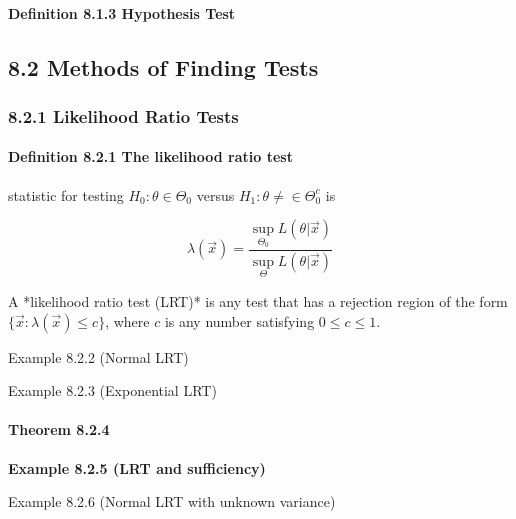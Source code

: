 \documentclass[6pt,twocolumn,Portrait]{article}
\let\oldparagraph\paragraph
\renewcommand{\paragraph}[1]{\oldparagraph{#1}\mbox{}}
\begin{document}
\hypertarget{HypoT}{%
\paragraph{\texorpdfstring{\textbf{Definition 8.1.3 Hypothesis
Test}}{Definition 8.1.3 Hypothesis Test}}\label{HypoT}}

\hypertarget{methods-of-finding-tests}{%
\subsection{8.2 Methods of Finding
Tests}\label{methods-of-finding-tests}}

\hypertarget{likelihood-ratio-tests}{%
\subsubsection{8.2.1 Likelihood Ratio
Tests}\label{likelihood-ratio-tests}}

\hypertarget{LRT}{%
\paragraph{\texorpdfstring{\textbf{Definition 8.2.1 The likelihood ratio
test}}{Definition 8.2.1 The likelihood ratio test}}\label{LRT}}

\begin{multicols}{2}

statistic for testing $H_0:\theta\in\Theta_0$ versus $H_1:\theta\ne\in\Theta_0^c$ is

$$\lambda(\vec x)=\frac{\sup\limits_{\Theta_0} L(\theta|\vec x)}{\sup\limits_{\Theta} L(\theta|\vec x)}$$

A *likelihood ratio test (LRT)* is any test that has a rejection region of the form $\{\vec x:\lambda(\vec x)\le c\}$, where $c$ is any number satisfying $0\le c\le 1$.

\end{multicols}

Example 8.2.2 (Normal LRT)

Example 8.2.3 (Exponential LRT)

\hypertarget{suff-LRT}{%
\paragraph{Theorem 8.2.4}\label{suff-LRT}}

\textbf{Example 8.2.5 (LRT and sufficiency)}

Example 8.2.6 (Normal LRT with unknown variance)
\end{document}
